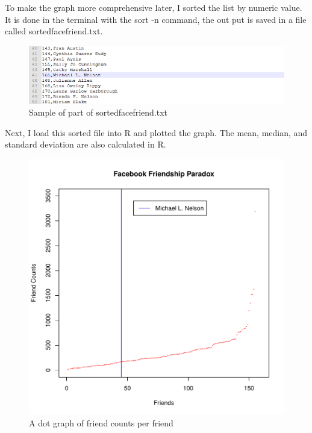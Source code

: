 \documentclass[12pt]{article}
\begin{document}


To make the graph more comprehensive later, I sorted the list by numeric value. It is done in the terminal with the sort -n command, the out put is saved in a file called sortedfacefriend.txt.

\begin{figure}[h]
\centering
\includegraphics[width=6.5in]{sortedfacefriend.png}
\caption{Sample of part of sortedfacefriend.txt}
\end{figure}

Next, I load this sorted file into R and plotted the graph. The mean, median, and standard deviation are also calculated in R.



\begin{figure}[h]
\centering
\includegraphics[width=5in]{FaceFriends.pdf}
\caption{A dot graph of friend counts per friend}
\end{figure}
\end{document}
